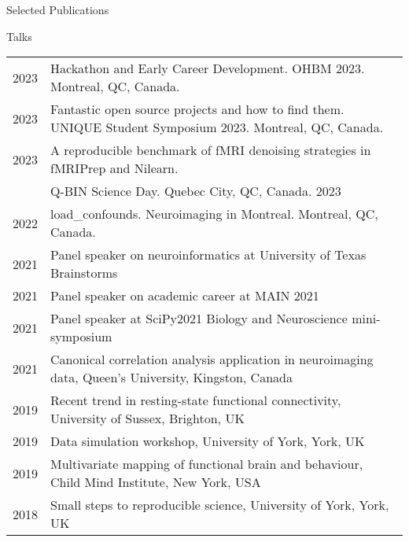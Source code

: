 \documentclass{resume} %
\begin{document}
\begin{rSection}{Selected Publications}

  

  


\end{rSection}


\begin{rSection}{Talks}
  \begin{tabular}{@{} l l @{\hspace{10ex}}}
    2023 & Hackathon and Early Career Development. OHBM 2023. Montreal, QC, Canada.\\
    2023 & Fantastic open source projects and how to find them. UNIQUE Student Symposium 2023. Montreal, QC, Canada.\\
    2023 & A reproducible benchmark of fMRI denoising strategies in fMRIPrep and Nilearn. \\ & Q-BIN Science Day. Quebec City, QC, Canada. 2023\\
   	2022 & load\_confounds. Neuroimaging in Montreal. Montreal, QC, Canada.\\
    2021 & Panel speaker on neuroinformatics at University of Texas Brainstorms\\
    2021 & Panel speaker on academic career at MAIN 2021\\
    2021 & Panel speaker at SciPy2021 Biology and Neuroscience mini-symposium\\
  	2021 & Canonical correlation analysis application in neuroimaging data, Queen's University, Kingston, Canada\\
    2019 & Recent trend in resting-state functional connectivity, University of Sussex, Brighton, UK\\
    2019 & Data simulation workshop, University of York, York, UK\\
    2019 & Multivariate mapping of functional brain and behaviour, Child Mind Institute, New York, USA\\
    2018 & Small steps to reproducible science, University of York, York, UK\\
  \end{tabular}
\end{rSection}
\end{document}
